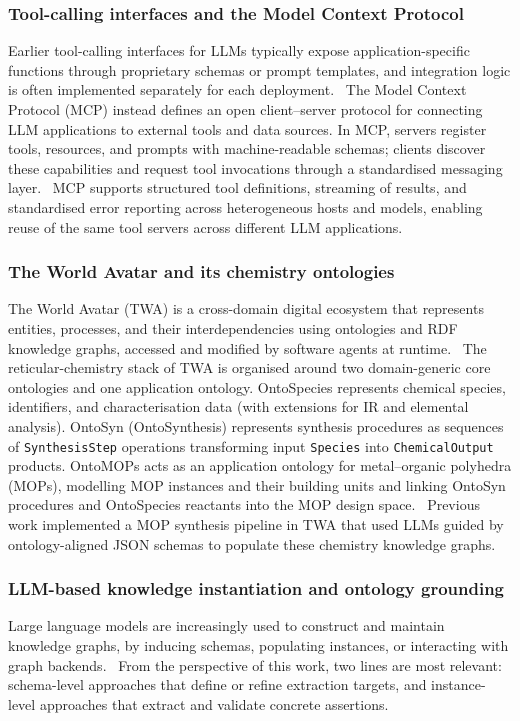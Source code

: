 \subsubsection{Tool-calling interfaces and the Model Context Protocol}
Earlier tool-calling interfaces for LLMs typically expose application-specific functions
through proprietary schemas or prompt templates, and integration logic is often implemented
separately for each deployment.~\cite{dave_chatgpt_2023,liu_we_2024,li_large_2024}
The Model Context Protocol (MCP) instead defines an open client--server protocol for
connecting LLM applications to external tools and data sources. In MCP, servers register
tools, resources, and prompts with machine-readable schemas; clients discover these
capabilities and request tool invocations through a standardised messaging layer.~\cite{mcp_spec_2025,openai_mcp_docs_2025}
MCP supports structured tool definitions, streaming of results, and standardised error
reporting across heterogeneous hosts and models, enabling reuse of the same tool servers
across different LLM applications.

\subsubsection{The World Avatar and its chemistry ontologies}
The World Avatar (TWA) is a cross-domain digital ecosystem that represents entities,
processes, and their interdependencies using ontologies and RDF knowledge graphs, accessed
and modified by software agents at runtime.~\cite{theworldavatar2025}
The reticular-chemistry stack of TWA is organised around two domain-generic core ontologies
and one application ontology. OntoSpecies represents chemical species, identifiers, and
characterisation data (with extensions for IR and elemental analysis). OntoSyn
(OntoSynthesis) represents synthesis procedures as sequences of \texttt{SynthesisStep}
operations transforming input \texttt{Species} into \texttt{ChemicalOutput} products.
OntoMOPs acts as an application ontology for metal--organic polyhedra (MOPs), modelling MOP
instances and their building units and linking OntoSyn procedures and OntoSpecies reactants
into the MOP design space.~\cite{theworldavatar2025,kondinski2022,pascazio2023,rihm2025}
Previous work implemented a MOP synthesis pipeline in TWA that used LLMs guided by
ontology-aligned JSON schemas to populate these chemistry knowledge graphs.~\cite{rihm2025}

\subsubsection{LLM-based knowledge instantiation and ontology grounding}
Large language models are increasingly used to construct and maintain knowledge graphs, by
inducing schemas, populating instances, or interacting with graph backends.~\citep{liang_survey_2024,ren2024survey}
From the perspective of this work, two lines are most relevant: schema-level approaches that
define or refine extraction targets, and instance-level approaches that extract and validate
concrete assertions.

